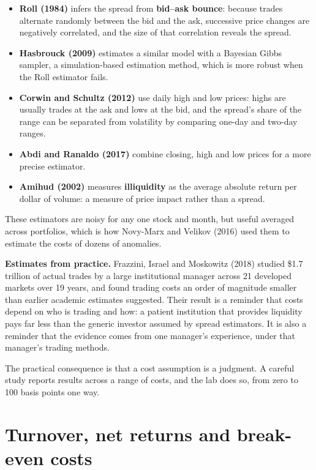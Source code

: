 \begin{itemize}
  \item \textbf{Roll (1984)} infers the spread from \textbf{bid--ask bounce}: because trades alternate randomly between the bid and the ask, successive price changes are negatively correlated, and the size of that correlation reveals the spread.
  \item \textbf{Hasbrouck (2009)} estimates a similar model with a Bayesian Gibbs sampler, a simulation-based estimation method, which is more robust when the Roll estimator fails.
  \item \textbf{Corwin and Schultz (2012)} use daily high and low prices: highs are usually trades at the ask and lows at the bid, and the spread's share of the range can be separated from volatility by comparing one-day and two-day ranges.
  \item \textbf{Abdi and Ranaldo (2017)} combine closing, high and low prices for a more precise estimator.
  \item \textbf{Amihud (2002)} measures \textbf{illiquidity} as the average absolute return per dollar of volume: a measure of price impact rather than a spread.
\end{itemize}

These estimators are noisy for any one stock and month, but useful averaged across portfolios, which is how Novy-Marx and Velikov (2016) used them to estimate the costs of dozens of anomalies.

\textbf{Estimates from practice.} Frazzini, Israel and Moskowitz (2018) studied \$1.7 trillion of actual trades by a large institutional manager across 21 developed markets over 19 years, and found trading costs an order of magnitude smaller than earlier academic estimates suggested. Their result is a reminder that costs depend on who is trading and how: a patient institution that provides liquidity pays far less than the generic investor assumed by spread estimators. It is also a reminder that the evidence comes from one manager's experience, under that manager's trading methods.

The practical consequence is that a cost assumption is a judgment. A careful study reports results across a range of costs, and the lab does so, from zero to 100 basis points one way.

\section{Turnover, net returns and break-even costs}
\label{sec:06-turnover}

